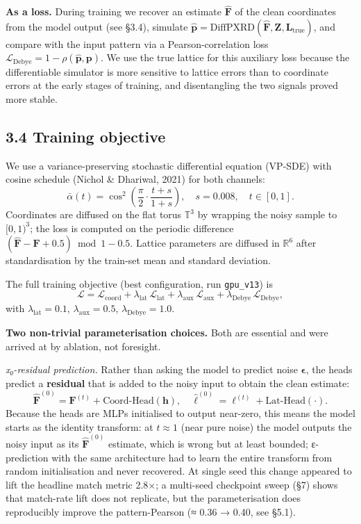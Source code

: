 \documentclass[
  11pt,
]{article}
\begin{document}
\textbf{As a loss.} During training we recover an estimate
\(\hat{\mathbf{F}}\) of the clean coordinates from the model output (see
§3.4), simulate
\(\hat{\mathbf{p}} = \text{DiffPXRD}(\hat{\mathbf{F}}, \mathbf{Z}, \mathbf{L}_\text{true})\),
and compare with the input pattern via a Pearson-correlation loss
\(\mathcal{L}_\text{Debye} = 1 - \rho(\hat{\mathbf{p}}, \mathbf{p})\).
We use the true lattice for this auxiliary loss because the
differentiable simulator is more sensitive to lattice errors than to
coordinate errors at the early stages of training, and disentangling the
two signals proved more stable.

\subsection{3.4 Training objective}\label{training-objective}

We use a variance-preserving stochastic differential equation (VP-SDE)
with cosine schedule (Nichol \& Dhariwal, 2021) for both channels: \[
\bar{\alpha}(t) = \cos^2\!\left(\frac{\pi}{2} \cdot \frac{t + s}{1 + s}\right),\quad s = 0.008,\quad t \in [0,1].
\] Coordinates are diffused on the flat torus \(\mathbb{T}^3\) by
wrapping the noisy sample to \([0,1)^3\); the loss is computed on the
periodic difference
\((\hat{\mathbf{F}} - \mathbf{F} + 0.5) \bmod 1 - 0.5\). Lattice
parameters are diffused in \(\mathbb{R}^6\) after standardisation by the
train-set mean and standard deviation.

The full training objective (best configuration, run \texttt{gpu\_v13})
is \[
\mathcal{L} = \mathcal{L}_\text{coord} + \lambda_\text{lat}\,\mathcal{L}_\text{lat} + \lambda_\text{aux}\,\mathcal{L}_\text{aux} + \lambda_\text{Debye}\,\mathcal{L}_\text{Debye},
\] with \(\lambda_\text{lat} = 0.1\), \(\lambda_\text{aux} = 0.5\),
\(\lambda_\text{Debye} = 1.0\).

\textbf{Two non-trivial parameterisation choices.} Both are essential
and were arrived at by ablation, not foresight.

\emph{x₀-residual prediction.} Rather than asking the model to predict
noise \(\boldsymbol{\epsilon}\), the heads predict a \textbf{residual}
that is added to the noisy input to obtain the clean estimate: \[
\hat{\mathbf{F}}^{(0)} = \mathbf{F}^{(t)} + \text{Coord-Head}(\mathbf{h}),\quad
\hat{\boldsymbol{\ell}}^{(0)} = \boldsymbol{\ell}^{(t)} + \text{Lat-Head}(\cdot).
\] Because the heads are MLPs initialised to output near-zero, this
means the model starts as the identity transform: at \(t \approx 1\)
(near pure noise) the model outputs the noisy input as its
\(\hat{\mathbf{F}}^{(0)}\) estimate, which is wrong but at least
bounded; ε-prediction with the same architecture had to learn the entire
transform from random initialisation and never recovered. At single seed
this change appeared to lift the headline match metric 2.8×; a
multi-seed checkpoint sweep (§7) shows that match-rate lift does not
replicate, but the parameterisation does reproducibly improve the
pattern-Pearson (≈ 0.36 → 0.40, see §5.1).
\end{document}
